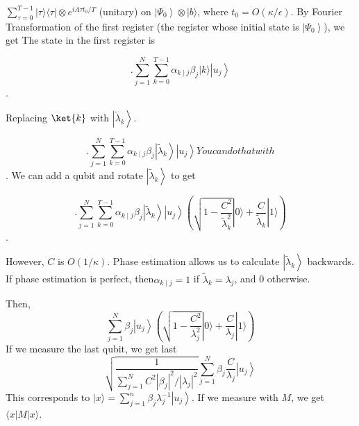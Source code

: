 \documentclass[b5paper,papersize,dvipdfmx,fleqn]{jsarticle}
\begin{document}
$\sum_{\tau=0}^{T-1}|\tau\rangle\langle\tau|\otimes e^{i A \tau t_{0} / T}$ (unitary) on $\left|\Psi_{0}\right\rangle\otimes|b\rangle$, where $t_{0}=O(\kappa / \epsilon)$. By Fourier Transformation of the first register (the register whose initial state is $\left|\Psi_{0}\right\rangle$), we get The state in the first register is

$$.
\sum_{j=1}^{N} \sum_{k=0}^{T-1} \alpha_{k \mid j} \beta_{j}|k\rangle\left|u_{j}\right\rangle
$$.

Replacing $\ket{k}$ with $\left|\tilde{\lambda}_{k}\right\rangle$.

$$.
\sum_{j=1}^{N} \sum_{k=0}^{T-1} \alpha_{k \mid j} \beta_{j}\left|\tilde{\lambda}_{k}\right\rangle\left|u_{j}\right\rangle
You can do that with $$.
We can add a qubit and rotate $\left|\tilde{\lambda}_{k}\right\rangle$ to get

$$.
\sum_{j=1}^{N} \sum_{k=0}^{T-1} \alpha_{k \mid j} \beta_{j}\left|\tilde{\lambda}_{k}\right\rangle\left|u_{j}\right\rangle\left(\sqrt{1-\frac{C^{2}}{\tilde{\lambda}_{k}^{2}}}|0\rangle+\frac{C}{\tilde{\lambda}_{k}}|1\rangle\right)
$$.

However, $C$ is $O(1 / \kappa)$. Phase estimation allows us to calculate $\left|\tilde{\lambda}_{k}\right\rangle $ backwards. If phase estimation is perfect, then$\alpha_{k \mid j}=1$ if $\tilde{\lambda}_{k}=\lambda_{j}$, and 0 otherwise.

Then,
$$
\sum_{j=1}^{N} \beta_{j}\left|u_{j}\right\rangle\left(\sqrt{1-\frac{C^{2}}{\lambda_{j}^{2}}}|0\rangle+\frac{C}{\lambda_{j}}|1\rangle\right)
$$
If we measure the last qubit, we get last
$$
\sqrt{\frac{1}{\sum_{j=1}^{N} C^{2}\left|\beta_{j}\right|^{2} /\left|\lambda_{j}\right|^{2}}} \sum_{j=1}^{N} \beta_{j} \frac{C}{\lambda_{j}}\left|u_{j}\right\rangle
$$
This corresponds to $|x\rangle=\sum_{j=1}^{n}\beta_{j}\lambda_{j}^{-1}\left|u_{j}\right\rangle$. If we measure with $M$, we get $\langle x|M| x\rangle$.
\end{document}
